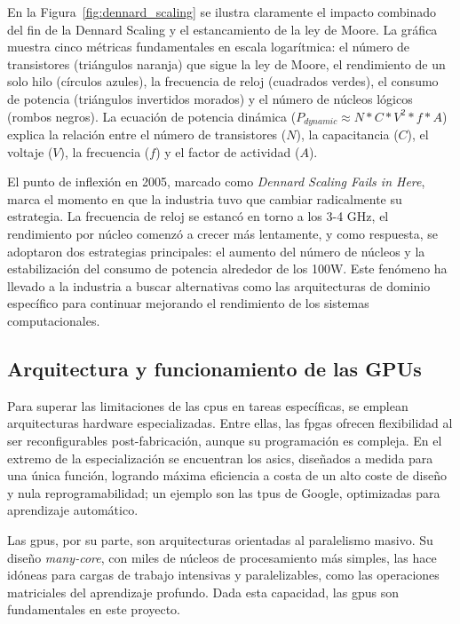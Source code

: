 \documentclass[11pt,spanish,listoffigures,listoftables]{tfgetsinf}
\begin{document}
En la Figura~\ref{fig:dennard_scaling} se ilustra claramente el impacto combinado del fin de la Dennard Scaling y el estancamiento de la ley de Moore. La gráfica muestra cinco métricas fundamentales en escala logarítmica: el número de transistores (triángulos naranja) que sigue la ley de Moore, el rendimiento de un solo hilo (círculos azules), la frecuencia de reloj (cuadrados verdes), el consumo de potencia (triángulos invertidos morados) y el número de núcleos lógicos (rombos negros). La ecuación de potencia dinámica ($P_{dynamic} \approx N * C * V^2 * f * A$) explica la relación entre el número de transistores ($N$), la capacitancia ($C$), el voltaje ($V$), la frecuencia ($f$) y el factor de actividad ($A$).

El punto de inflexión en 2005, marcado como \textit{Dennard Scaling Fails in Here}, marca el momento en que la industria tuvo que cambiar radicalmente su estrategia. La frecuencia de reloj se estancó en torno a los 3-4 GHz, el rendimiento por núcleo comenzó a crecer más lentamente, y como respuesta, se adoptaron dos estrategias principales: el aumento del número de núcleos y la estabilización del consumo de potencia alrededor de los 100W. Este fenómeno ha llevado a la industria a buscar alternativas como las arquitecturas de dominio específico para continuar mejorando el rendimiento de los sistemas computacionales.

\subsection{Arquitectura y funcionamiento de las GPUs} \label{sec:arquitectura_gpus}

Para superar las limitaciones de las \glspl{cpu} en tareas específicas, se emplean arquitecturas hardware especializadas. Entre ellas, las \glspl{fpga} ofrecen flexibilidad al ser reconfigurables post-fabricación, aunque su programación es compleja. En el extremo de la especialización se encuentran los \glspl{asic}, diseñados a medida para una única función, logrando máxima eficiencia a costa de un alto coste de diseño y nula reprogramabilidad; un ejemplo son las \glspl{tpu} de Google, optimizadas para aprendizaje automático.

Las \glspl{gpu}, por su parte, son arquitecturas orientadas al paralelismo masivo. Su diseño \textit{many-core}, con miles de núcleos de procesamiento más simples, las hace idóneas para cargas de trabajo intensivas y paralelizables, como las operaciones matriciales del aprendizaje profundo. Dada esta capacidad, las \glspl{gpu} son fundamentales en este proyecto.
\end{document}
